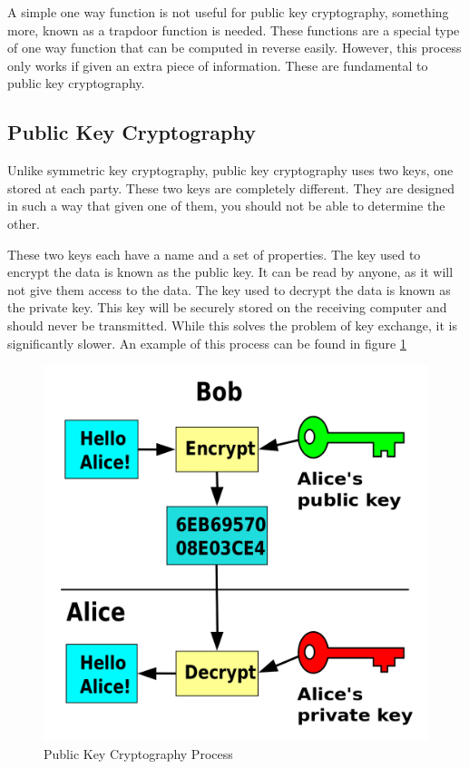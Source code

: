 				A simple one way function is not useful for public key cryptography, 
				something more, known as a trapdoor function is needed. 
				These functions are a special type of one way function that can be computed in reverse easily. 
				However, this process only works if given an extra piece of information. 
				These are fundamental to public key cryptography. 

			\subsection{Public Key Cryptography}
				Unlike symmetric key cryptography, public key cryptography uses two keys, one stored at each party. 
				These two keys are completely different. 
				They are designed in such a way that given one of them, you should not be able to determine the other. 

				These two keys each have a name and a set of properties. 
				The key used to encrypt the data is known as the public key. 
				It can be read by anyone, as it will not give them access to the data. 
				The key used to decrypt the data is known as the private key. 
				This key will be securely stored on the receiving computer and should never be transmitted. 
				While this solves the problem of key exchange, it is significantly slower. 
				An example of this process can be found in figure \ref{fig:PublicKey}
				\begin{figure}[htb]
					\centering
					\includegraphics[scale=0.25]{./PublicKey.png}
					\caption{Public Key Cryptography Process}
					\label{fig:PublicKey}
				\end{figure}

